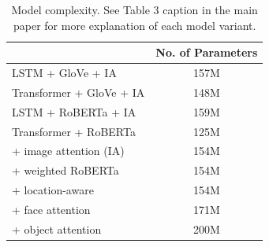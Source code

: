 \documentclass[10pt,twocolumn,letterpaper]{article}
\begin{document}
\begin{table}[t] \caption {Model complexity. See Table 3 caption in the main
   paper for more explanation of each model variant.}
   \label{tab:models}
   \centering
   \begin{tabularx}{\linewidth}{Xc}
      \toprule
                                                   & No. of Parameters \\
      \midrule
      LSTM + GloVe + IA             & 157M              \\
      Transformer + GloVe + IA        & 148M              \\
      LSTM + RoBERTa + IA     & 159M              \\
      \midrule
      Transformer + RoBERTa                       & 125M              \\
      \quad + image attention (IA)          & 154M              \\
      \quad\quad + weighted RoBERTa                & 154M              \\
      \quad\quad\quad + location-aware             & 154M              \\
      \quad\quad\quad\quad + face attention        & 171M              \\
      \quad\quad\quad\quad\quad + object attention & 200M              \\
      \bottomrule
   \end{tabularx}
\end{table}


{\small


}
\end{document}

